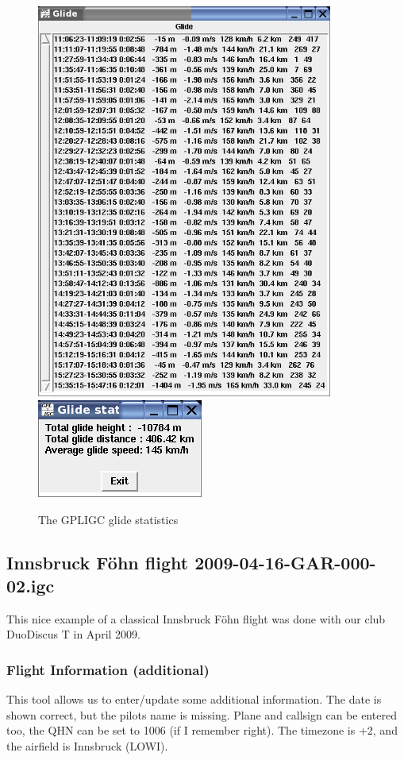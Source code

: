 \begin{figure}[h]
\caption{\label{glide}The GPLIGC glide statistics}
\begin{center}
\includegraphics[height=13cm]{png/glidestat1}
\includegraphics{png/glidestat2}
\end{center}
\end{figure}

\clearpage

\subsection{Innsbruck F\"ohn flight 2009-04-16-GAR-000-02.igc}
This nice example of a classical Innsbruck F\"ohn flight was done with our club DuoDiscus T in April 2009.

\subsubsection{Flight Information (additional)}
This tool allows us to enter/update some additional information. The date is shown correct, but the pilots name is missing.
Plane and callsign can be entered too, the QHN can be set to 1006 (if I remember right). The timezone is +2, and the airfield is Innsbruck (LOWI).

